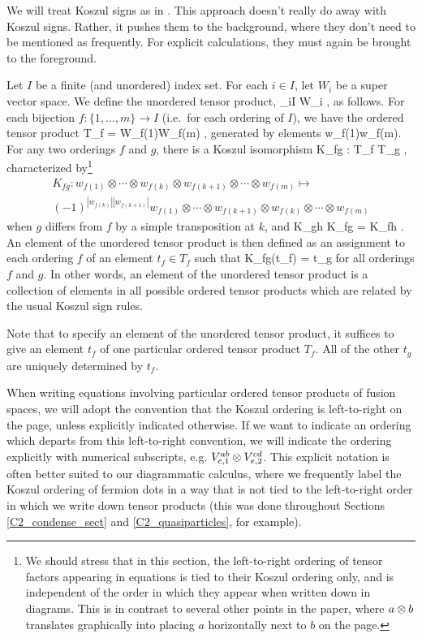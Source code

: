 We will treat Koszul signs as in \cite[Section 1.2]{deligne1999}.
This approach doesn't really do away with Koszul signs.
Rather, it pushes them to the background, where they don't need to be mentioned as frequently.
For explicit calculations, they must again be brought to the foreground.

Let $I$ be a finite (and unordered) index set.
For each $i\in I$, let $W_i$ be a super vector space.
We define the unordered tensor product,
\be
	\bigotimes_{i\in I} W_i ,
\ee
as follows.
For each bijection $f: \{1, \ldots,m\} \to I$ (i.e.\ for each ordering of $I$),
we have the ordered tensor product
\be
	T_f = W_{f(1)}\otimes\cdots\otimes W_{f(m)} ,
\ee
generated by elements
\be
	w_{f(1)}\otimes\cdots\otimes w_{f(m)}.
\ee
For any two orderings $f$ and $g$, there is a Koszul isomorphism
\be
	K_{fg} : T_f \to T_g ,
\ee
characterized by\footnote{
We should stress that in this section, 
the left-to-right ordering of tensor factors appearing in equations is tied to their Koszul ordering only, and
is independent of the order in which they appear when written down in diagrams. 
This is in contrast to several other points in the 
paper, where $a\otimes b$ translates graphically into placing $a$ horizontally next to $b$ on the page.
} 
\begin{multline}
	K_{fg} : w_{f(1)}\otimes\cdots\otimes w_{f(k)} \otimes w_{f(k+1)} \otimes \cdots \otimes w_{f(m)} \mapsto \\
				(-1)^{|w_{f(k)}||w_{f(k+1)}|} w_{f(1)}\otimes\cdots\otimes w_{f(k+1)} \otimes w_{f(k)} \otimes \cdots \otimes w_{f(m)}
\end{multline}
when $g$ differs from $f$ by a simple transposition at $k$, and
\be
	K_{gh} \circ K_{fg} = K_{fh} .
\ee
An element of the unordered tensor product is then defined as an assignment to each ordering $f$ of an element $t_f\in T_f$
such that
\be
	K_{fg}(t_f) = t_g
\ee
for all orderings $f$ and $g$.
In other words, an element of the unordered tensor product is a collection of elements in all 
possible ordered tensor products which are related by the usual Koszul sign rules.


Note that to specify an element of the unordered tensor product, it suffices to give an element $t_f$ of one
particular ordered tensor product $T_f$.
All of the other $t_g$ are uniquely determined by $t_f$.

When writing equations involving particular ordered tensor products of fusion spaces, we will adopt the 
convention that the Koszul ordering is left-to-right on the page, unless explicitly 
indicated otherwise. If we want to indicate an ordering which departs from this left-to-right convention, 
we will indicate the ordering explicitly with numerical subscripts, 
e.g. $V^{ab}_{c,1} \otimes V^{cd}_{e,2}$.
This explicit notation is often better suited to our diagrammatic calculus, where 
we frequently label the Koszul ordering of fermion dots in a way that is not tied to the 
left-to-right order in which we write down tensor products (this was done throughout Sections
\ref{C2_condense_sect} and \ref{C2_quasiparticles}, for example). 

